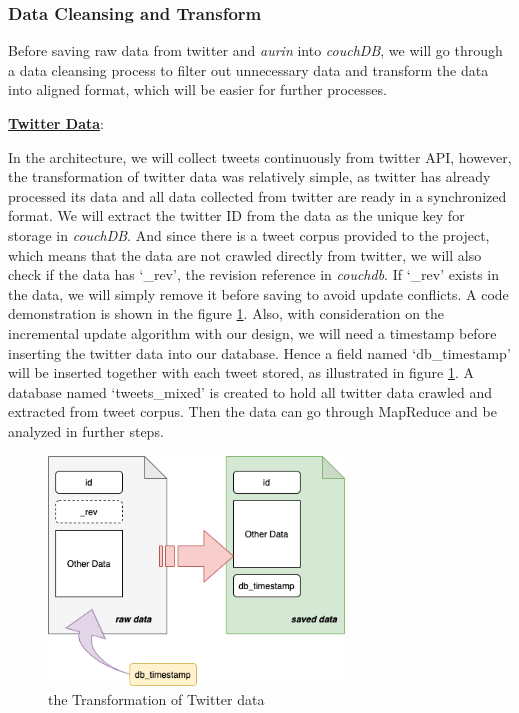 \documentclass{article}
\begin{document}
\subsubsection{Data Cleansing and Transform}
Before saving raw data from twitter and \textit{aurin} into \textit{couchDB}, we will go through a data cleansing process to filter out unnecessary data and transform the data into aligned format, which will be easier for further processes. 

\textbf{\underline{Twitter Data}}: 

In the architecture, we will collect tweets continuously from twitter API, however, the transformation of twitter data was relatively simple, as twitter has already processed its data and all data collected from twitter are ready in a synchronized format. We will extract the twitter ID from the data as the unique key for storage in \textit{couchDB}. And since there is a tweet corpus provided to the project, which means that the data are not crawled directly from twitter, we will also check if the data has ‘\_rev’, the revision reference in \textit{couchdb}. If ‘\_rev’ exists in the data, we will simply remove it before saving to avoid update conflicts. A code demonstration is shown in the figure \ref{fig:twitterdata}.
Also, with consideration on the incremental update algorithm with our design, we will need a timestamp before inserting the twitter data into our database. Hence a field named ‘db\_timestamp’ will be inserted together with each tweet stored, as illustrated in figure \ref{fig:twitterdata}. A database named ‘tweets\_mixed’ is created to hold all twitter data crawled and extracted from tweet corpus. Then the data can go through MapReduce and be analyzed in further steps.
\begin{figure}
\centering
\includegraphics[width=0.7\textwidth]{img/twitterdata.png}
\caption{the Transformation of Twitter data}
\label{fig:twitterdata}
\end{figure}
\end{document}
